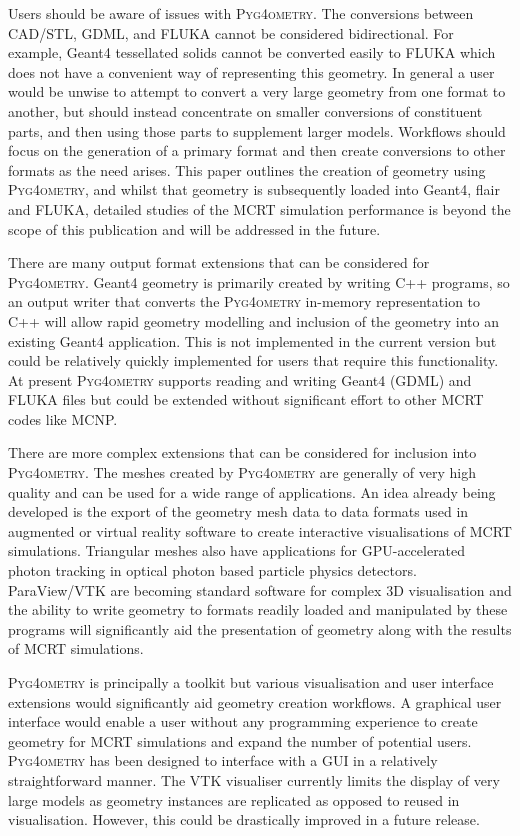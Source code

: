 \documentclass[preprint,12pt]{elsarticle}
\newcommand{\PYGEOMETRY}{\textsc{Pyg4ometry}}
\begin{document}
Users should be aware of issues with \PYGEOMETRY{}. The conversions between CAD/STL, GDML, and FLUKA
cannot be considered bidirectional. For example, Geant4 tessellated solids cannot be converted easily to FLUKA which does not
have a convenient way of representing this geometry. In general a user would be unwise to attempt to convert a very large
geometry from one format to another, but should instead concentrate on smaller conversions of constituent parts, 
and then using those parts to supplement larger models. Workflows should focus
on the generation of a primary format and then create conversions to other formats as the need arises. This paper outlines
the creation of geometry using \PYGEOMETRY{}, and whilst that geometry is subsequently loaded into Geant4, flair and FLUKA, detailed
studies of the MCRT simulation performance is beyond the scope of this publication and will be addressed in the future.

There are many output format extensions that can be considered for \PYGEOMETRY{}.
Geant4 geometry is primarily created by writing C++ programs, so an output writer that
converts the \PYGEOMETRY{} in-memory representation to C++ will allow rapid geometry
modelling and inclusion of the geometry into an existing Geant4 application. This is not
implemented in the current version but could be relatively quickly implemented for users that
require this functionality. At present \PYGEOMETRY{} supports reading and writing
Geant4 (GDML) and FLUKA files but could be extended without significant effort to other MCRT codes
like MCNP.

There are more complex extensions that can be considered for inclusion into \PYGEOMETRY{}.
The meshes created by \PYGEOMETRY{} are generally of very high quality and can be used for a
wide range of applications. An idea already being developed is the export of the geometry mesh data to
data formats used in augmented or virtual reality software to create interactive visualisations of MCRT
simulations.  Triangular meshes also have applications for GPU-accelerated photon tracking in
optical photon based particle physics detectors. ParaView/VTK are becoming standard software for 
complex 3D visualisation and the ability to write geometry to formats readily loaded and manipulated 
by these programs will significantly aid the presentation of geometry along with the results of MCRT 
simulations.

\PYGEOMETRY{} is principally a toolkit but various visualisation and user interface extensions would
significantly aid geometry creation workflows. A graphical user interface would enable a user without any
 programming experience to create geometry for MCRT simulations and expand the number of potential users.
\PYGEOMETRY{} has been designed to interface with a GUI in a relatively straightforward manner. The VTK visualiser currently
limits the display of very large models as geometry instances are replicated as opposed to reused in visualisation.  However,
this could be drastically improved in a future release.
\end{document}
